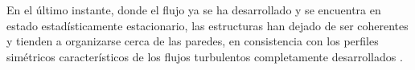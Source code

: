 En el último instante, donde el flujo ya se ha desarrollado y se encuentra en estado estadísticamente estacionario, las estructuras han dejado de ser coherentes y tienden a organizarse cerca de las paredes, en consistencia con los perfiles simétricos característicos de los flujos turbulentos completamente desarrollados \cite{machaca2024}.

\begin{figure}%
  \centering  
    
  

\end{figure}
